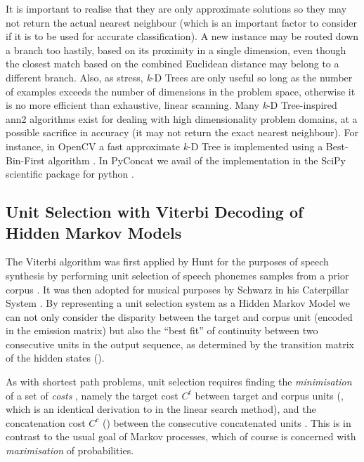 {{{{{{{It is important to realise that they are only approximate solutions so they may not return the actual nearest neighbour (which is an important factor to consider if it is to be used for accurate classification). A new instance may be routed down a branch too hastily, based on its proximity in a single dimension, even though the closest match based on the combined Euclidean distance may  belong to a different branch. Also, as \cite{Russell2002} stress, \textit{k}-D Trees are only useful so long as the number of examples exceeds the number of dimensions in the problem space, otherwise it is no more efficient than exhaustive, linear scanning. Many \textit{k}-D Tree-inspired \acrfull{ann2} algorithms exist for dealing with high dimensionality problem domains, at a possible sacrifice in accuracy (it may not return the exact nearest neighbour). For instance, in OpenCV a fast approximate \textit{k}-D Tree is implemented using a Best-Bin-First algorithm \citep{kaehler2016learning}. In PyConcat we avail of the implementation in the SciPy scientific package for python \citep{Scipy2014}.

\subsection{Unit Selection with Viterbi Decoding of Hidden Markov Models}
\label{viterbi_unit_selection}

The Viterbi algorithm was first applied by Hunt for the purposes of speech synthesis by performing unit selection of speech phonemes samples from a prior corpus \citep{Hunt1996}. It was then adopted for musical purposes by Schwarz in his Caterpillar System \citep{Schwarz2003}. By representing a unit selection system as a Hidden Markov Model we can not only consider the disparity between the target and corpus unit (encoded in the emission matrix) but also the “best fit” of continuity between two consecutive units in the output sequence, as determined by the transition matrix of the hidden states ().

As with shortest path problems, unit selection requires finding the \textit{minimisation} of a set of \textit{costs} \citep{Hunt1996}, namely the target cost $C^{t}$ between target and corpus units (, which is an identical derivation to  in the linear search method), and the concatenation cost $C^{c}$ () between the consecutive concatenated units \citep{Schwarz2003}. This is in contrast to the usual goal of Markov processes, which of course is concerned with \textit{maximisation} of probabilities. 

}}}}}}}
